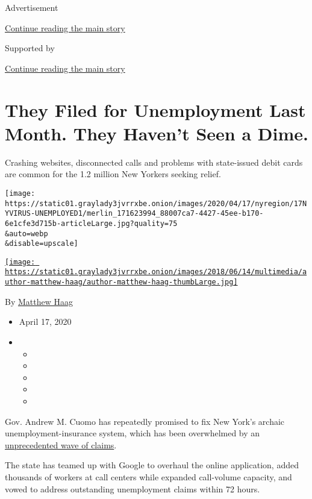 Advertisement

\protect\hyperlink{after-top}{Continue reading the main story}

Supported by

\protect\hyperlink{after-sponsor}{Continue reading the main story}

\hypertarget{they-filed-for-unemployment-last-month-they-havent-seen-a-dime}{%
\section{They Filed for Unemployment Last Month. They Haven't Seen a
Dime.}\label{they-filed-for-unemployment-last-month-they-havent-seen-a-dime}}

Crashing websites, disconnected calls and problems with state-issued
debit cards are common for the 1.2 million New Yorkers seeking relief.

\texttt{[image: https://static01.graylady3jvrrxbe.onion/images/2020/04/17/nyregion/17NYVIRUS-UNEMPLOYED1/merlin\_171623994\_88007ca7-4427-45ee-b170-6e1cfe3d715b-articleLarge.jpg?quality=75\\\&auto=webp\\\&disable=upscale]}

\href{https://www.nytimes3xbfgragh.onion/by/matthew-haag}{\texttt{[image: https://static01.graylady3jvrrxbe.onion/images/2018/06/14/multimedia/author-matthew-haag/author-matthew-haag-thumbLarge.jpg]}}

By \href{https://www.nytimes3xbfgragh.onion/by/matthew-haag}{Matthew
Haag}

\begin{itemize}
\item
  April 17, 2020
\item
  \begin{itemize}
  \item
  \item
  \item
  \item
  \item
  \end{itemize}
\end{itemize}

Gov. Andrew M. Cuomo has repeatedly promised to fix New York's archaic
unemployment-insurance system, which has been overwhelmed by an
\href{https://www.nytimes3xbfgragh.onion/2020/05/14/business/economy/coronavirus-unemployment-claims.html}{unprecedented
wave of claims}.

The state has teamed up with Google to overhaul the online application,
added thousands of workers at call centers while expanded call-volume
capacity, and vowed to address outstanding unemployment claims within 72
hours.

